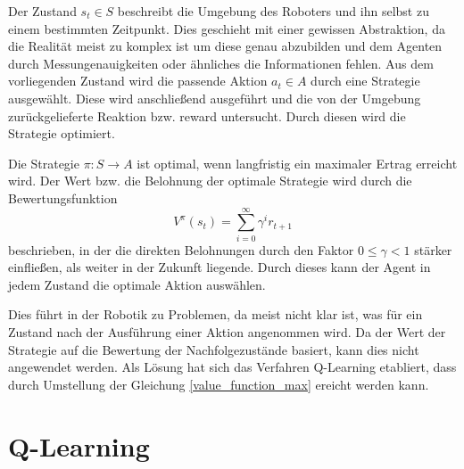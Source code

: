 Der Zustand $s_t \in S$ beschreibt die Umgebung des Roboters und ihn selbst zu einem bestimmten Zeitpunkt. Dies geschieht mit einer gewissen Abstraktion, da die Realität meist zu komplex ist um diese genau abzubilden und dem Agenten durch Messungenauigkeiten oder ähnliches die Informationen fehlen. Aus dem vorliegenden Zustand wird die passende Aktion $a_t \in A$ durch eine Strategie ausgewählt. Diese wird anschließend ausgeführt und die von der Umgebung zurückgelieferte Reaktion bzw. reward untersucht. Durch diesen wird die Strategie optimiert. \cite{Ertel_2013}\par
Die Strategie $\pi: S \rightarrow A$ ist optimal, wenn langfristig ein maximaler Ertrag erreicht wird. Der Wert bzw. die Belohnung der  optimale Strategie wird durch die Bewertungsfunktion 
\begin{equation}
	\label{value_function_max}
	V^{\pi}(s_t) = \sum_{i=0}^{\infty}\gamma^{i}r_{t+1}
\end{equation}
beschrieben, in der die direkten Belohnungen durch den Faktor $0 \le \gamma < 1$ stärker einfließen, als weiter in der Zukunft liegende. Durch dieses kann der Agent in jedem Zustand die optimale Aktion auswählen. \cite{Ertel_2013}\par
Dies führt in der Robotik zu Problemen, da meist nicht klar ist, was für ein Zustand nach der Ausführung einer Aktion angenommen wird. Da der Wert der Strategie auf die Bewertung der Nachfolgezustände basiert, kann dies nicht angewendet werden. Als Lösung hat sich das Verfahren Q-Learning etabliert, dass durch Umstellung der Gleichung \ref{value_function_max} ereicht werden kann.

\section{Q-Learning} %
\label{sec:q_learning}

